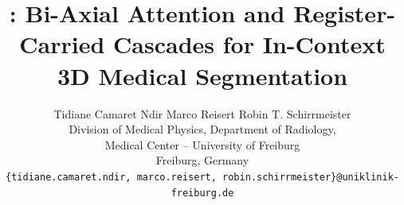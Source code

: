 \documentclass[10pt,twocolumn,letterpaper]{article}
\title{\TODO{Model name}: Bi-Axial Attention and Register-Carried Cascades for In-Context 3D Medical Segmentation}
\author{Tidiane Camaret Ndir \qquad Marco Reisert \qquad Robin T. Schirrmeister\\
Division of Medical Physics, Department of Radiology,\\
Medical Center -- University of Freiburg\\
Freiburg, Germany\\
{\tt\small \{tidiane.camaret.ndir, marco.reisert, robin.schirrmeister\}@uniklinik-freiburg.de}
}
\begin{document}
\maketitle








{
    \small
    
    
}

% 
\end{document}
